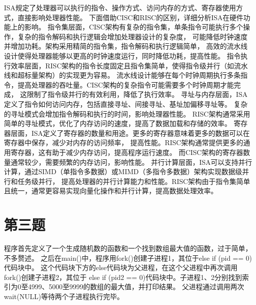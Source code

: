 \documentclass[UTF8]{ctexart}
\begin{document}
ISA规定了处理器可以执行的指令、操作方式、访问内存的方式、寄存器使用方式，直接影响处理器性能。
下面借助CISC和RISC的区别，详细分析ISA在硬件功能上的影响。
指令集层面，CISC架构有复杂的指令集，单条指令可能执行多个操作，复杂的指令解码和执行逻辑会增加处理器设计的复杂度，
可能降低时钟速度并增加功耗。架构采用精简的指令集，指令解码和执行逻辑简单，
高效的流水线设计使得处理器能够以更高的时钟速度运行，同时降低功耗，提高性能。
指令执行效率层面，RISC架构的指令长度固定且指令集简单，使得指令级并行（如流水线和超标量架构）的实现更为容易。
流水线设计能够在每个时钟周期执行多条指令，提高处理器的吞吐量。CISC架构的复杂指令可能需要多个时钟周期才能完成，
这限制了指令级并行的有效利用，降低了执行效率。
寻址与内存层面，ISA定义了指令如何访问内存，包括直接寻址、间接寻址、基址加偏移寻址等。
复杂的寻址模式会增加指令解码和执行的时间，影响处理器性能。
RISC架构通常采用简单的寻址模式，优化了内存访问的速度，提高了数据加载和存储的效率。
寄存器层面，ISA定义了寄存器的数量和用途。更多的寄存器意味着更多的数据可以在寄存器中保存，减少对内存的访问频率，
提高性能。RISC架构通常提供更多的通用寄存器，这有助于减少内存访问，提高程序运行速度。
而CISC架构的寄存器数量通常较少，需要频繁的内存访问，影响性能。
并行计算层面，ISA可以支持并行计算，通过SIMD（单指令多数据）或MIMD（多指令多数据）架构实现数据级并行和任务级并行，
提高处理器的并行计算能力和性能。RISC架构由于指令集简单且统一，通常更容易实现向量化操作和并行计算，提高数据处理效率。

\section{第三题}
程序首先定义了一个生成随机数的函数和一个找到数组最大值的函数，过于简单，不多赘述。
之后在main()中，程序用fork()创建子进程1，其位于else if (pid == 0)代码块中。
这个代码块下方的else代码块为父进程，在这个父进程中再次调用fork()创建子进程2，其位于
else if (pid2 == 0)代码块中。子进程1、2分别找到索引为0至4999、5000至9999的数组的最大值，并打印结果。
父进程通过调用两次wait(NULL)等待两个子进程执行完毕。
\end{document}
